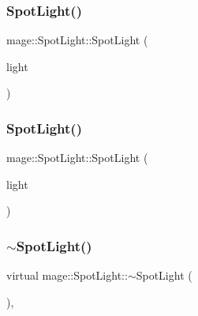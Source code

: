 \hypertarget{classmage_1_1_spot_light_adac6974e9cbfdae4612e2d88229e654d}{}\label{classmage_1_1_spot_light_adac6974e9cbfdae4612e2d88229e654d} 
\subsubsection{\texorpdfstring{Spot\+Light()}{SpotLight()}\hspace{0.1cm}{\footnotesize\ttfamily [2/3]}}
{\footnotesize\ttfamily mage\+::\+Spot\+Light\+::\+Spot\+Light (\begin{DoxyParamCaption}\item[{const \hyperlink{classmage_1_1_spot_light}{Spot\+Light} \&}]{light }\end{DoxyParamCaption})\hspace{0.3cm}{\ttfamily [default]}}

\hypertarget{classmage_1_1_spot_light_a404e8f8f37100bff11042831ff22fe8f}{}\label{classmage_1_1_spot_light_a404e8f8f37100bff11042831ff22fe8f} 
\subsubsection{\texorpdfstring{Spot\+Light()}{SpotLight()}\hspace{0.1cm}{\footnotesize\ttfamily [3/3]}}
{\footnotesize\ttfamily mage\+::\+Spot\+Light\+::\+Spot\+Light (\begin{DoxyParamCaption}\item[{\hyperlink{classmage_1_1_spot_light}{Spot\+Light} \&\&}]{light }\end{DoxyParamCaption})\hspace{0.3cm}{\ttfamily [default]}}

\hypertarget{classmage_1_1_spot_light_a924dd88ca89b3064d6cfce546eab322a}{}\label{classmage_1_1_spot_light_a924dd88ca89b3064d6cfce546eab322a} 
\subsubsection{\texorpdfstring{$\sim$\+Spot\+Light()}{~SpotLight()}}
{\footnotesize\ttfamily virtual mage\+::\+Spot\+Light\+::$\sim$\+Spot\+Light (\begin{DoxyParamCaption}{ }\end{DoxyParamCaption})\hspace{0.3cm}{\ttfamily [virtual]}, {\ttfamily [default]}}



